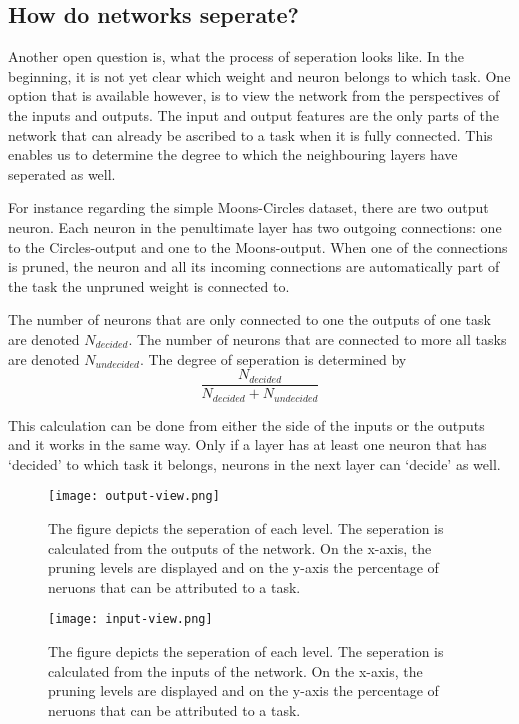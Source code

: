 \subsection{How do networks seperate?}
Another open question is, what the process of seperation looks like.
In the beginning, it is not yet clear which weight and neuron belongs to which task.
One option that is available however, is to view the network from the perspectives of the inputs and outputs.
The input and output features are the only parts of the network that can already be ascribed to a task when it is fully connected.
This enables us to determine the degree to which the neighbouring layers have seperated as well.

For instance regarding the simple Moons-Circles dataset, there are two output neuron.
Each neuron in the penultimate layer has two outgoing connections: one to the Circles-output and one to the Moons-output.
When one of the connections is pruned, the neuron and all its incoming connections are automatically part of the task the unpruned weight is connected to.

The number of neurons that are only connected to one the outputs of one task are denoted $N_{decided}$.
The number of neurons that are connected to more all tasks are denoted $N_{undecided}$.
The degree of seperation is determined by 
\[
\frac{N_{decided}}{N_{decided}+N_{undecided}}
\]

This calculation can be done from either the side of the inputs or the outputs and it works in the same way.
Only if a layer has at least one neuron that has `decided' to which task it belongs, neurons in the next layer can `decide' as well.

\begin{figure}[ht]
    \centering
    \texttt{[image: output-view.png]}
    \caption{
    The figure depicts the seperation of each level.
    The seperation is calculated from the outputs of the network.
    On the x-axis, the pruning levels are displayed and on the y-axis the percentage of neruons that can be attributed to a task.
    }\label{fig:outview}
\end{figure}

\begin{figure}[ht]
    \centering
    \texttt{[image: input-view.png]}
    \caption{    
    The figure depicts the seperation of each level.
    The seperation is calculated from the inputs of the network.
    On the x-axis, the pruning levels are displayed and on the y-axis the percentage of neruons that can be attributed to a task.
    }\label{fig:inview}
\end{figure}

